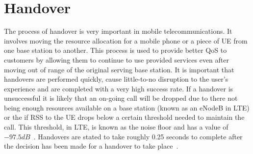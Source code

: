 \section{Handover}\label{handover}
The process of handover is very important in mobile telecommunications. It involves moving the resource allocation for a mobile phone or a piece of \ac{UE} from one base station to another. This process is used to provide better \ac{QoS} to customers by allowing them to continue to use provided services even after moving out of range of the original serving base station. It is important that handovers are performed quickly, cause little-to-no disruption to the user's experience and are completed with a very high success rate. If a handover is unsuccessful it is likely that an on-going call will be dropped due to there not being enough resources available on a base station (known as an \ac{eNodeB} in \ac{LTE}) or the if \ac{RSS} to the \ac{UE} drops below a certain threshold needed to maintain the call. This threshold, in LTE, is known as the noise floor and has a value of $-97.5 dB$~\cite{holma2009lte}. Handovers are stated to take roughly 0.25 seconds to complete after the decision has been made for a handover to take place~\cite{jansen2010handover}.
